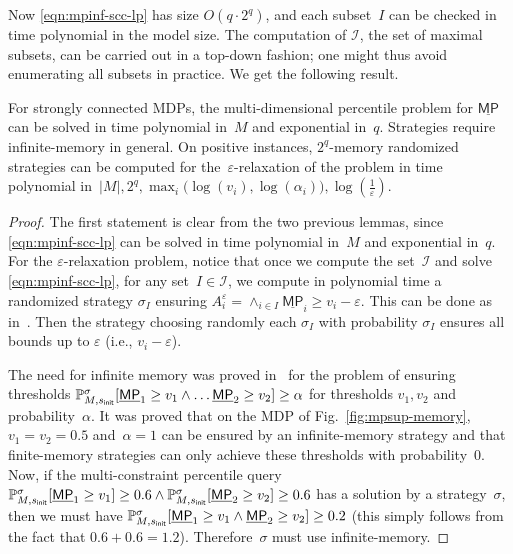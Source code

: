 \documentclass{llncs}
\newcommand{\initState}{\ensuremath{s_{{\sf init}}} }
\newcommand*{\pr}{\mathbb{P}}
\newcommand*{\mpinf}{\ensuremath{\underline{\mathsf{MP}}}}
\newcommand\calI{\ensuremath{\mathcal{I}}}
\begin{document}
Now \eqref{eqn:mpinf-scc-lp} has size $O(q\cdot 2^q)$, and each subset~$I$ can be checked in time polynomial in the model size.
The computation of $\calI$, the set of maximal subsets, can be carried out in a top-down fashion;
one might thus avoid enumerating all subsets in practice.
We get the following result.

\begin{lemma}
  For strongly connected MDPs, the multi-dimensional percentile problem for $\mpinf$  can be solved in time polynomial 
  in~$M$ and exponential in~$q$. Strategies require infinite-memory in general.
  On positive instances, $2^q$-memory randomized strategies can be computed for the~$\varepsilon$-relaxation of the problem
  in time polynomial in~$|M|, 2^q, \max_i\big(\log(v_i), \log(\alpha_i)\big), \log(\frac{1}{\varepsilon})$.
\end{lemma}

\begin{proof}
  The first statement is clear from the two previous lemmas, since 
  \eqref{eqn:mpinf-scc-lp} can be solved in time polynomial in~$M$ and exponential in~$q$.
  For the $\varepsilon$-relaxation problem, notice that
  once we compute the set~$\calI$ and solve \eqref{eqn:mpinf-scc-lp}, for any set~$I \in \calI$, we compute in polynomial time a randomized strategy $\sigma_I$ ensuring $A_i^\varepsilon = \wedge_{i \in I} \mpinf_i \geq v_i -\varepsilon$. This can be done 
  as in~\cite{BBCFK-lmcs14}. Then the strategy choosing randomly each $\sigma_I$ with probability $\sigma_I$  ensures all bounds up to $\varepsilon$ (i.e., $v_i-\varepsilon$).

  The need for infinite memory was proved in~\cite[Section 5]{BBCFK-lmcs14} for the problem of
  ensuring thresholds $\pr_{M,\initState}^\sigma[ \mpinf_1 \geq v_1 \land \ldots \mpinf_2 \geq v_2 ] \geq \alpha$ for thresholds $v_1,v_2$ and probability~$\alpha$.
  It was proved that on the MDP of Fig.~\ref{fig:mpsup-memory}, $v_1=v_2=0.5$ and~$\alpha=1$ can be ensured by an infinite-memory strategy and that
  finite-memory strategies can only achieve these thresholds with probability~$0$.
  Now, if the multi-constraint percentile query $\pr_{M,\initState}^\sigma[ \mpinf_1\geq v_1] \geq 0.6 \land \pr_{M,\initState}^\sigma[\mpinf_2\geq v_2]\geq 0.6$ 
  has a solution by a strategy~$\sigma$, then we must have $\pr_{M,\initState}^\sigma[\mpinf_1\geq v_1\land \mpinf_2\geq v_2]\geq 0.2$ (this simply follows from the fact that
  $0.6+0.6=1.2$). Therefore~$\sigma$ must use infinite-memory.  
\end{proof}
\end{document}
